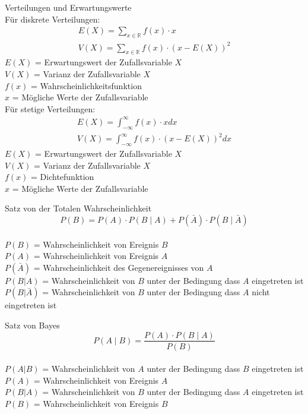 \begin{definition}{Verteilungen und Erwartungswerte}\\
Für diskrete Verteilungen:
$$
\begin{gathered}
E(X)=\sum_{x \in \mathbb{R}} f(x) \cdot x \\
V(X)=\sum_{x \in \mathbb{R}} f(x) \cdot(x-E(X))^2
\end{gathered}
$$
$E(X)$ = Erwartungswert der Zufallsvariable $X$\\
$V(X)$ = Varianz der Zufallsvariable $X$\\
$f(x)$ = Wahrscheinlichkeitsfunktion\\
$x$ = Mögliche Werte der Zufallsvariable\\

Für stetige Verteilungen:
$$
\begin{gathered}
E(X)=\int_{-\infty}^{\infty} f(x) \cdot x dx \\
V(X)=\int_{-\infty}^{\infty} f(x) \cdot(x-E(X))^2 dx
\end{gathered}
$$
$E(X)$ = Erwartungswert der Zufallsvariable $X$\\
$V(X)$ = Varianz der Zufallsvariable $X$\\
$f(x)$ = Dichtefunktion\\
$x$ = Mögliche Werte der Zufallsvariable\\
\end{definition}
\begin{theorem}{Satz von der Totalen Wahrscheinlichkeit}\\
$$
P(B)=P(A) \cdot P(B \mid A)+P(\bar{A}) \cdot P(B \mid \bar{A})
$$
\\
$P(B)$ = Wahrscheinlichkeit von Ereignis $B$\\
$P(A)$ = Wahrscheinlichkeit von Ereignis $A$\\
$P(\bar{A})$ = Wahrscheinlichkeit des Gegenereignisses von $A$\\
$P(B|A)$ = Wahrscheinlichkeit von $B$ unter der Bedingung dass $A$ eingetreten ist\\
$P(B|\bar{A})$ = Wahrscheinlichkeit von $B$ unter der Bedingung dass $A$ nicht eingetreten ist\\
\end{theorem}

\begin{theorem}{Satz von Bayes}\\
$$
P(A \mid B)=\frac{P(A) \cdot P(B \mid A)}{P(B)}
$$
\\
$P(A|B)$ = Wahrscheinlichkeit von $A$ unter der Bedingung dass $B$ eingetreten ist\\
$P(A)$ = Wahrscheinlichkeit von Ereignis $A$\\
$P(B|A)$ = Wahrscheinlichkeit von $B$ unter der Bedingung dass $A$ eingetreten ist\\
$P(B)$ = Wahrscheinlichkeit von Ereignis $B$\\
\end{theorem}
